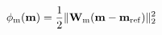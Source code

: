 \begin{equation}
\phi_{\rm m}(\mathbf{m}) = \frac{1}{2} \| \mathbf{W}_{\rm m} (\mathbf{m} - \mathbf{m}_{\rm ref}) \|_2^2
\label{eq:l2-regularization}
\end{equation}
